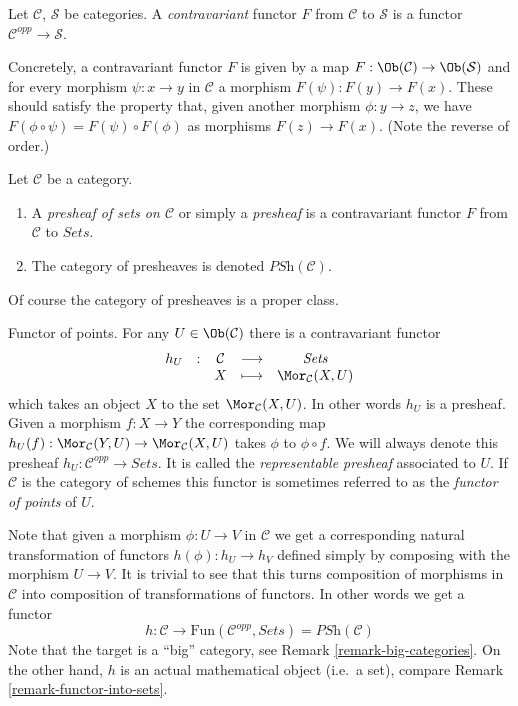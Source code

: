 \begin{definition}
\label{definition-contravariant}
Let $\mathcal{C}$, $\mathcal{S}$ be categories.
A {\it contravariant} functor $F$
from $\mathcal{C}$ to $\mathcal{S}$
is a functor $\mathcal{C}^{opp}\to \mathcal{S}$.
\end{definition}

\noindent
Concretely, a contravariant functor $F$ is given
by a map $F : \Ob(\mathcal{C}) \to
\Ob(\mathcal{S})$ and for every morphism
$\psi : x \to y$ in $\mathcal{C}$ a morphism
$F(\psi) : F(y) \to F(x)$. These should satisfy the property
that, given another morphism
$\phi : y \to z$, we have $F(\phi \circ \psi)
= F(\psi) \circ F(\phi)$ as morphisms $F(z) \to F(x)$.
(Note the reverse of order.)

\begin{definition}
\label{definition-presheaf}
Let $\mathcal{C}$ be a category.
\begin{enumerate}
\item A {\it presheaf of sets on $\mathcal{C}$}
or simply a {\it presheaf} is a contravariant functor
$F$ from $\mathcal{C}$ to $\textit{Sets}$.
\item The category of presheaves is denoted $\textit{PSh}(\mathcal{C})$.
\end{enumerate}
\end{definition}

\noindent
Of course the category of presheaves is a proper class.

\begin{example}
\label{example-hom-functor}
Functor of points.
For any $U\in \Ob(\mathcal{C})$ there is a contravariant
functor
$$
\begin{matrix}
h_U & : & \mathcal{C}
&
\longrightarrow
&
\textit{Sets} \\
& &
X
&
\longmapsto
&
\Mor_\mathcal{C}(X, U)
\end{matrix}
$$
which takes an object $X$ to the set
$\Mor_\mathcal{C}(X, U)$. In other words $h_U$ is a presheaf.
Given a morphism $f : X\to Y$ the corresponding map
$h_U(f) :  \Mor_\mathcal{C}(Y, U)\to \Mor_\mathcal{C}(X, U)$
takes $\phi$ to $\phi\circ f$. We will always denote
this presheaf $h_U : \mathcal{C}^{opp} \to \textit{Sets}$.
It is called the {\it representable presheaf} associated to $U$.
If $\mathcal{C}$ is the category of schemes this functor is
sometimes referred to as the
\emph{functor of points} of $U$.
\end{example}

\noindent
Note that given a morphism $\phi : U \to V$ in $\mathcal{C}$ we get a
corresponding natural transformation of functors
$h(\phi) : h_U \to h_V$ defined simply by composing with the morphism
$U \to V$. It is trivial to see that this turns
composition of morphisms in $\mathcal{C}$ into composition of
transformations of functors. In other words we get a functor
$$
h :
\mathcal{C}
\longrightarrow
\text{Fun}(\mathcal{C}^{opp}, \textit{Sets}) = \textit{PSh}(\mathcal{C})
$$
Note that the target is a ``big'' category, see
Remark \ref{remark-big-categories}. On the other hand,
$h$ is an actual mathematical object (i.e.\ a set), compare Remark
\ref{remark-functor-into-sets}.

